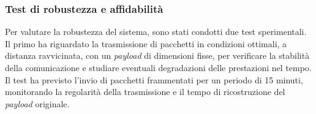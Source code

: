 \documentclass[12pt,a4paper,twoside]{book}
\begin{document}
\subsubsection{Test di robustezza e affidabilità}
\ifdefined\HCode
    \begin{table}[H]
        \centering
        \caption{Condizioni del test di robustezza e affidabilità.}
        \label{tab:T5-conditions-html}
    \end{table}
\else
    \begin{table}[H]
        \centering
        \caption{Condizioni del test di robustezza e affidabilità.}
        \label{tab:T5-conditions-pdf}
    \end{table}
\fi
Per valutare la robustezza del sistema, sono stati condotti due test sperimentali.
Il primo ha riguardato la trasmissione di pacchetti in condizioni ottimali, a distanza
ravvicinata, con un \emph{payload} di dimensioni fisse, per verificare la stabilità
della comunicazione e studiare eventuali degradazioni delle prestazioni nel tempo.
Il test ha previsto l'invio di pacchetti frammentati per un periodo di 15 minuti,
monitorando la regolarità della trasmissione e il tempo di ricostruzione del \emph{payload} originale.
\end{document}
